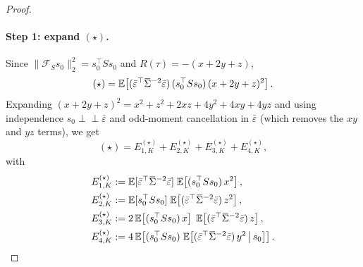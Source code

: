 \begin{proof}
\paragraph{Step 1: expand $(\star)$.}
Since $\|\mathcal F_S s_0\|_2^2=s_0^\top S s_0$ and $R(\tau)=-(x+2y+z)$,
\[
(\star)
=
\E\!\left[(\bar\varepsilon^\top  \overline\Sigma^{-2}\bar\varepsilon)\,(s_0^\top S s_0)\,(x+2y+z)^2\right].
\]
Expanding $(x+2y+z)^2=x^2+z^2+2xz+4y^2+4xy+4yz$ and using independence
$s_0\perp\!\!\!\perp\bar\varepsilon$ and odd-moment cancellation in $\bar\varepsilon$
(which removes the $xy$ and $yz$ terms), we get
\[
(\star)=E^{(\star)}_{1,K}+E^{(\star)}_{2,K}+E^{(\star)}_{3,K}+E^{(\star)}_{4,K},
\]
with
\begin{align*}
E^{(\star)}_{1,K}
&:= \E[\bar\varepsilon^\top  \overline\Sigma^{-2}\bar\varepsilon]\;\E\!\left[(s_0^\top S s_0)\,x^2\right],\\
E^{(\star)}_{2,K}
&:= \E[s_0^\top S s_0]\;\E\!\left[(\bar\varepsilon^\top  \overline\Sigma^{-2}\bar\varepsilon)\,z^2\right],\\
E^{(\star)}_{3,K}
&:= 2\,\E\!\left[(s_0^\top S s_0)\,x\right]\;\E\!\left[(\bar\varepsilon^\top  \overline\Sigma^{-2}\bar\varepsilon)\,z\right],\\
E^{(\star)}_{4,K}
&:= 4\,\E\!\left[(s_0^\top S s_0)\;
\E\!\left[(\bar\varepsilon^\top  \overline\Sigma^{-2}\bar\varepsilon)\,y^2\,\middle|\,s_0\right]\right].
\end{align*}


\end{proof}
